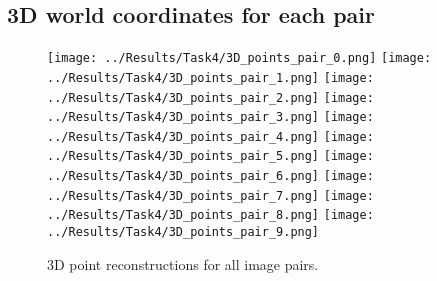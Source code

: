 \documentclass{article}
\begin{document}
\subsection{3D world coordinates for each pair}
\begin{figure}[H]
    \centering
    \texttt{[image: ../Results/Task4/3D\_points\_pair\_0.png]}
    \texttt{[image: ../Results/Task4/3D\_points\_pair\_1.png]}
    \texttt{[image: ../Results/Task4/3D\_points\_pair\_2.png]}
    \texttt{[image: ../Results/Task4/3D\_points\_pair\_3.png]}
    \texttt{[image: ../Results/Task4/3D\_points\_pair\_4.png]}
    \texttt{[image: ../Results/Task4/3D\_points\_pair\_5.png]}
    \texttt{[image: ../Results/Task4/3D\_points\_pair\_6.png]}
    \texttt{[image: ../Results/Task4/3D\_points\_pair\_7.png]}
    \texttt{[image: ../Results/Task4/3D\_points\_pair\_8.png]}
    \texttt{[image: ../Results/Task4/3D\_points\_pair\_9.png]}
    \caption{3D point reconstructions for all image pairs.}
\end{figure}
\end{document}
